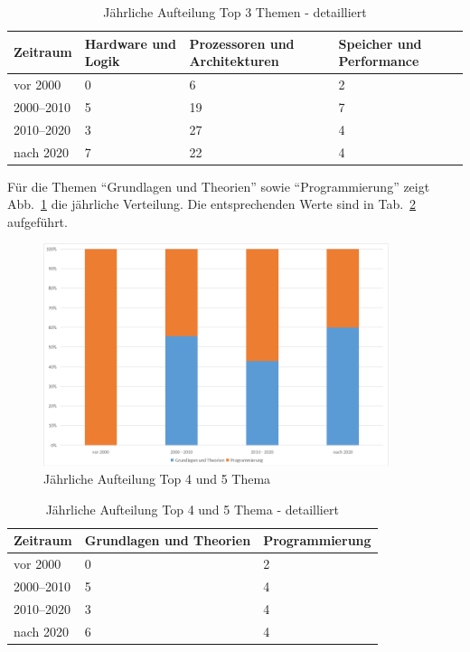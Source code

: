 \begin{table}[!htbp]
    \centering
    \caption{Jährliche Aufteilung Top 3 Themen - detailliert}
    \label{tab:themen-zeit}
    \tiny
    \begin{tabularx}{\textwidth}{lXXX}
        \hline
        \textbf{Zeitraum} & \textbf{Hardware und Logik} & \textbf{Prozessoren und Architekturen} & \textbf{Speicher und Performance} \\
        \hline
        vor 2000      & 0  & 6  & 2 \\
        2000--2010    & 5  & 19 & 7 \\
        2010--2020    & 3  & 27 & 4 \\
        nach 2020     & 7  & 22 & 4 \\
        \hline
    \end{tabularx}
\end{table}

Für die Themen \enquote{Grundlagen und Theorien} sowie \enquote{Programmierung} zeigt Abb.~\ref{fig:5-top5-themen} die jährliche Verteilung. Die entsprechenden Werte sind in Tab.~\ref{tab:themen-zeit-2} aufgeführt.

\begin{figure}[!htbp]
    \centering
    \caption{Jährliche Aufteilung Top 4 und 5 Thema}
    \label{fig:5-top5-themen}
    \includegraphics[width=0.90\textwidth]{graphics/5-top5-themen-jahr.png}
\end{figure}

\begin{table}[!htbp]
    \centering
    \caption{Jährliche Aufteilung Top 4 und 5 Thema - detailliert}
    \label{tab:themen-zeit-2}
    \tiny
    \begin{tabularx}{\textwidth}{lXX}
        \hline
        \textbf{Zeitraum} & \textbf{Grundlagen und Theorien} & \textbf{Programmierung} \\
        \hline
        vor 2000      & 0 & 2 \\
        2000--2010    & 5 & 4 \\
        2010--2020    & 3 & 4 \\
        nach 2020     & 6 & 4 \\
        \hline
    \end{tabularx}
\end{table}

